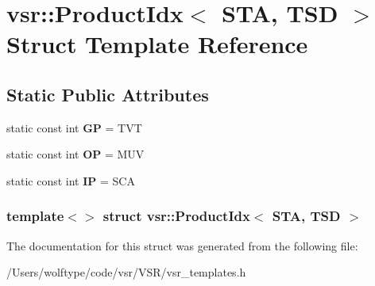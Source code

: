 \hypertarget{structvsr_1_1_product_idx_3_01_s_t_a_00_01_t_s_d_01_4}{\section{vsr\-:\-:Product\-Idx$<$ S\-T\-A, T\-S\-D $>$ Struct Template Reference}
\label{structvsr_1_1_product_idx_3_01_s_t_a_00_01_t_s_d_01_4}
}
\subsection*{Static Public Attributes}
\begin{DoxyCompactItemize}
\item 
\hypertarget{structvsr_1_1_product_idx_3_01_s_t_a_00_01_t_s_d_01_4_aa8bb33bf04dd0e96072d7fb387d16ef7}{static const int {\bfseries G\-P} = T\-V\-T}\label{structvsr_1_1_product_idx_3_01_s_t_a_00_01_t_s_d_01_4_aa8bb33bf04dd0e96072d7fb387d16ef7}

\item 
\hypertarget{structvsr_1_1_product_idx_3_01_s_t_a_00_01_t_s_d_01_4_adacf0eaa57d5e1d8b3cc7140c1b4dbda}{static const int {\bfseries O\-P} = M\-U\-V}\label{structvsr_1_1_product_idx_3_01_s_t_a_00_01_t_s_d_01_4_adacf0eaa57d5e1d8b3cc7140c1b4dbda}

\item 
\hypertarget{structvsr_1_1_product_idx_3_01_s_t_a_00_01_t_s_d_01_4_a05b77e2f197ab3a3979953f8ae6ab102}{static const int {\bfseries I\-P} = S\-C\-A}\label{structvsr_1_1_product_idx_3_01_s_t_a_00_01_t_s_d_01_4_a05b77e2f197ab3a3979953f8ae6ab102}

\end{DoxyCompactItemize}
\subsubsection*{template$<$$>$ struct vsr\-::\-Product\-Idx$<$ S\-T\-A, T\-S\-D $>$}



The documentation for this struct was generated from the following file\-:\begin{DoxyCompactItemize}
\item 
/\-Users/wolftype/code/vsr/\-V\-S\-R/vsr\-\_\-templates.\-h\end{DoxyCompactItemize}
